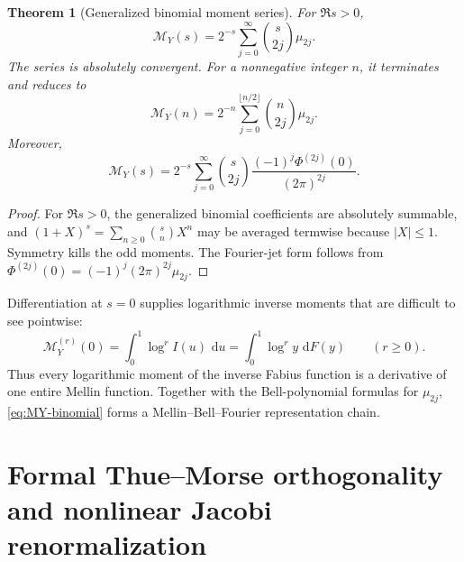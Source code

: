 \documentclass[11pt]{article}
\newtheorem{theorem}{Theorem}[section]
\theoremstyle{definition}
\theoremstyle{remark}
\newcommand{\dd}{\,\mathrm d}
\begin{document}
\begin{theorem}[Generalized binomial moment series]
\label{thm:mellin-binomial}
For \(\Re s>0\),
\begin{equation}
\boxed{
 \mathcal M_Y(s)
 =2^{-s}\sum_{j=0}^{\infty}\binom{s}{2j}\mu_{2j}.}         \label{eq:MY-binomial}
\end{equation}
The series is absolutely convergent.  For a nonnegative integer \(n\), it terminates and
reduces to
\begin{equation}
 \mathcal M_Y(n)=2^{-n}
 \sum_{j=0}^{\lfloor n/2\rfloor}\binom n{2j}\mu_{2j}.      \label{eq:MY-integer}
\end{equation}
Moreover,
\begin{equation}
 \mathcal M_Y(s)
 =2^{-s}\sum_{j=0}^{\infty}\binom{s}{2j}
 \frac{(-1)^j\Phi^{(2j)}(0)}{(2\pi)^{2j}}.                 \label{eq:MY-Fourier-jet}
\end{equation}
\end{theorem}

\begin{proof}
For \(\Re s>0\), the generalized binomial coefficients are absolutely summable, and
\((1+X)^s=\sum_{n\ge0}\binom{s}{n}X^n\) may be averaged termwise because
\(|X|\le1\).  Symmetry kills the odd moments.  The Fourier-jet form follows from
\(\Phi^{(2j)}(0)=(-1)^j(2\pi)^{2j}\mu_{2j}\).
\end{proof}

Differentiation at \(s=0\) supplies logarithmic inverse moments that are difficult to see
pointwise:
\begin{equation}
 \mathcal M_Y^{(r)}(0)
 =\int_0^1\log^r I(u)\,\dd u
 =\int_0^1\log^r y\,\dd F(y)\qquad(r\ge0).                 \label{eq:inverse-log-moments}
\end{equation}
Thus every logarithmic moment of the inverse Fabius function is a derivative of one entire
Mellin function.  Together with the Bell-polynomial formulas for \(\mu_{2j}\),
\eqref{eq:MY-binomial} forms a Mellin--Bell--Fourier representation chain.

\section{Formal Thue--Morse orthogonality and nonlinear Jacobi renormalization}
\label{sec:tm-formal-jacobi}
\end{document}
